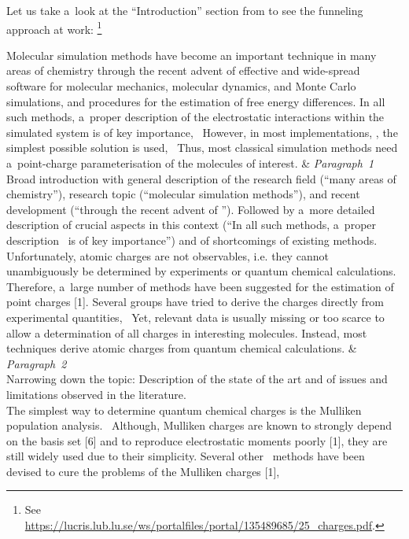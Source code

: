 \documentclass[12pt, a4paper, oneside]{article}
\newlength{\smalllinespacing}
\theoremstyle{Plain}
\theoremstyle{Definition}
\theoremstyle{Remark}
\begin{document}
Let us take a~look at the ``Introduction'' section from \citet{sigfridsson} to see the funneling approach at work:%
\footnote{See \url{https://lucris.lub.lu.se/ws/portalfiles/portal/135489685/25_charges.pdf}.}
\begin{tcolorbox}
	\begin{tblr}{}
		Molecular simulation methods have become an important technique in many areas of chemistry through the recent advent of effective and wide-spread software for molecular mechanics, molecular dynamics, and Monte Carlo simulations, and procedures for the estimation of free energy differences. In all such methods, a~proper description of the electrostatic interactions within the simulated system is of key importance, \textellipsis\ However, in most implementations, \textellipsis, the simplest possible solution is used, \textellipsis\ Thus, most classical simulation methods need a~point-charge parameterisation of the molecules of interest.
		&
		{%
			\textit{Paragraph~1} \\
			\textmd{Broad introduction with general description of the research field (``many areas of
			chemistry''), research topic (``molecular simulation methods''), and recent development (``through the recent advent of \textellipsis''). Followed by a~more detailed description of crucial aspects in this context (``In all such methods, a~proper description \textellipsis\ is of key importance'') and of shortcomings of existing methods.}
		}
		\\
		\hspace{\smalllinespacing}Unfortunately, atomic charges are not observables, i.e. they cannot unambiguously be determined by experiments or quantum chemical calculations. Therefore, a~large number of methods have been suggested for the estimation of point charges [1]. Several groups have tried to derive the charges directly from experimental quantities, \textellipsis\ Yet, relevant data is usually missing or too scarce to allow a determination of all charges in interesting molecules. Instead, most techniques derive atomic charges from quantum chemical calculations.
		&
		{%
			\textit{Paragraph~2} \\
			Narrowing down the topic: Description of the state of the art and of issues and limitations observed in the literature.%
		}
		\\
		{%
			\hspace{\smalllinespacing}The simplest way to determine quantum chemical charges is the Mulliken population
			analysis. \textellipsis\ Although, Mulliken charges are known to strongly depend on the basis set [6] and to reproduce electrostatic moments poorly [1], they are still widely used due to their simplicity. Several other \textellipsis\ methods have been devised to cure the problems of the Mulliken charges [1], \textellipsis
}
\end{tblr}
\end{tcolorbox}
\end{document}
